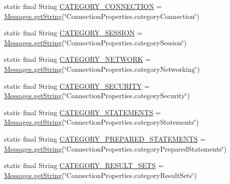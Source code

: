 \begin{DoxyCompactItemize}
\item 
static final String \mbox{\hyperlink{classcom_1_1mysql_1_1cj_1_1conf_1_1_property_definitions_aaa85e1eae7c15eb2016ad1d0482f593d}{C\+A\+T\+E\+G\+O\+R\+Y\+\_\+\+C\+O\+N\+N\+E\+C\+T\+I\+ON}} = \mbox{\hyperlink{classcom_1_1mysql_1_1cj_1_1_messages_a86a388448aa7759254c491b3e1320d31}{Messages.\+get\+String}}(\char`\"{}Connection\+Properties.\+category\+Connection\char`\"{})
\item 
static final String \mbox{\hyperlink{classcom_1_1mysql_1_1cj_1_1conf_1_1_property_definitions_a065601b3789c856ea6ff2fc7d7f8b78c}{C\+A\+T\+E\+G\+O\+R\+Y\+\_\+\+S\+E\+S\+S\+I\+ON}} = \mbox{\hyperlink{classcom_1_1mysql_1_1cj_1_1_messages_a86a388448aa7759254c491b3e1320d31}{Messages.\+get\+String}}(\char`\"{}Connection\+Properties.\+category\+Session\char`\"{})
\item 
static final String \mbox{\hyperlink{classcom_1_1mysql_1_1cj_1_1conf_1_1_property_definitions_aa123fbd702dd0a478656f20514e6dcde}{C\+A\+T\+E\+G\+O\+R\+Y\+\_\+\+N\+E\+T\+W\+O\+RK}} = \mbox{\hyperlink{classcom_1_1mysql_1_1cj_1_1_messages_a86a388448aa7759254c491b3e1320d31}{Messages.\+get\+String}}(\char`\"{}Connection\+Properties.\+category\+Networking\char`\"{})
\item 
static final String \mbox{\hyperlink{classcom_1_1mysql_1_1cj_1_1conf_1_1_property_definitions_a0d33c2aa7fb9aa0b35fc8462145f0323}{C\+A\+T\+E\+G\+O\+R\+Y\+\_\+\+S\+E\+C\+U\+R\+I\+TY}} = \mbox{\hyperlink{classcom_1_1mysql_1_1cj_1_1_messages_a86a388448aa7759254c491b3e1320d31}{Messages.\+get\+String}}(\char`\"{}Connection\+Properties.\+category\+Security\char`\"{})
\item 
static final String \mbox{\hyperlink{classcom_1_1mysql_1_1cj_1_1conf_1_1_property_definitions_a10322d0fdd809c6246948b13951a0802}{C\+A\+T\+E\+G\+O\+R\+Y\+\_\+\+S\+T\+A\+T\+E\+M\+E\+N\+TS}} = \mbox{\hyperlink{classcom_1_1mysql_1_1cj_1_1_messages_a86a388448aa7759254c491b3e1320d31}{Messages.\+get\+String}}(\char`\"{}Connection\+Properties.\+category\+Statements\char`\"{})
\item 
static final String \mbox{\hyperlink{classcom_1_1mysql_1_1cj_1_1conf_1_1_property_definitions_aceab9345e94a7ebb1dc9a4d898a5c680}{C\+A\+T\+E\+G\+O\+R\+Y\+\_\+\+P\+R\+E\+P\+A\+R\+E\+D\+\_\+\+S\+T\+A\+T\+E\+M\+E\+N\+TS}} = \mbox{\hyperlink{classcom_1_1mysql_1_1cj_1_1_messages_a86a388448aa7759254c491b3e1320d31}{Messages.\+get\+String}}(\char`\"{}Connection\+Properties.\+category\+Prepared\+Statements\char`\"{})
\item 
static final String \mbox{\hyperlink{classcom_1_1mysql_1_1cj_1_1conf_1_1_property_definitions_aa2ce7153fb21feb8dbdc1149e4ea6f24}{C\+A\+T\+E\+G\+O\+R\+Y\+\_\+\+R\+E\+S\+U\+L\+T\+\_\+\+S\+E\+TS}} = \mbox{\hyperlink{classcom_1_1mysql_1_1cj_1_1_messages_a86a388448aa7759254c491b3e1320d31}{Messages.\+get\+String}}(\char`\"{}Connection\+Properties.\+category\+Result\+Sets\char`\"{})

\end{DoxyCompactItemize}
